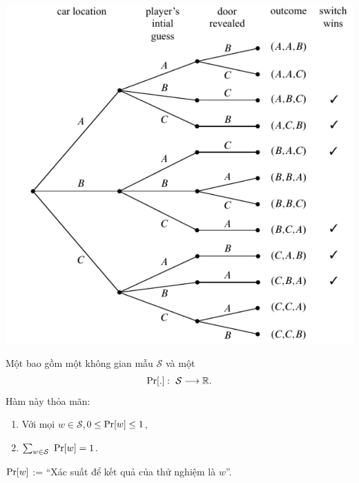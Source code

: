 \begin{frame}
      \begin{block}{}
        \begin{center}
          \includegraphics[scale=0.5]{fig174.pdf}
        \end{center}
      \end{block}
\end{frame}

\begin{frame}
  \begin{dfntn}
    Một  bao gồm một không gian mẫu $\mathcal{S}$ và một   
    \[
   \mathrm{Pr}[.] :\ \mathcal{S} \longrightarrow \mathbb{R}.
    \]
Hàm này  thỏa mãn:
\begin{enumerate}
\item Với mọi $w \in \mathcal{S}$,\quad  $0 \leq \mathrm{Pr}[w] \leq 1$,
\item $\sum_{w \in \mathcal{S}}\ \mathrm{Pr}[w] = 1 $.
\end{enumerate} 
  \end{dfntn}

$\mathrm{Pr}[w]$ := ``Xác suất để kết quả của thử nghiệm  là  $w$''. 
\end{frame}

